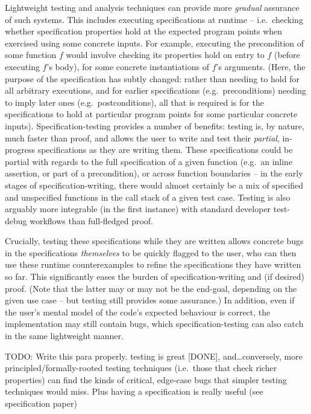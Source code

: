 \documentclass[withindex,glossary]{cam-thesis}
\begin{document}
Lightweight testing and analysis techniques can provide more \emph{gradual} assurance of such systems. This includes executing specifications at runtime -- i.e.~checking whether specification properties hold at the expected program points when exercised using some concrete inputs. For example, executing the precondition of some function $f$ would involve checking its properties hold on entry to $f$ (before executing $f$'s body), for some concrete instantiations of $f$'s arguments. (Here, the purpose of the specification has subtly changed: rather than needing to hold for all arbitrary executions, and for earlier specifications (e.g.~preconditions) needing to imply later ones (e.g.~postconditions), all that is required is for the specifications to hold at particular program points for some particular concrete inputs).  Specification-testing provides a number of benefits: testing is, by nature, much faster than proof, and allows the user to write and test their \emph{partial}, in-progress specifications as they are writing them. These specifications could be partial with regards to the full specification of a given function (e.g.~an inline assertion, or part of a precondition), or across function boundaries -- in the early stages of specification-writing, there would almost certainly be a mix of specified and unspecified functions in the call stack of a given test case. Testing is also arguably more integrable (in the first instance) with standard developer test-debug workflows than full-fledged proof.

Crucially, testing these specifications while they are written allows concrete bugs in the specifications \emph{themselves} to be quickly flagged to the user, who can then use these runtime counterexamples to refine the specifications they have written so far. This significantly eases the burden of specification-writing and (if desired) proof. (Note that the latter may or may not be the end-goal, depending on the given use case -- but testing still provides some assurance.) In addition, even if the user's mental model of the code's expected behaviour is correct, the implementation may still contain bugs, which specification-testing can also catch in the same lightweight manner.   

TODO: Write this para properly. testing is great [DONE], and\ldots conversely, more principled/formally-rooted testing techniques (i.e.~those that check richer properties) can find the kinds of critical, edge-case bugs that simpler testing techniques would miss. Plus having a specification is really useful (see specification paper)
\end{document}
